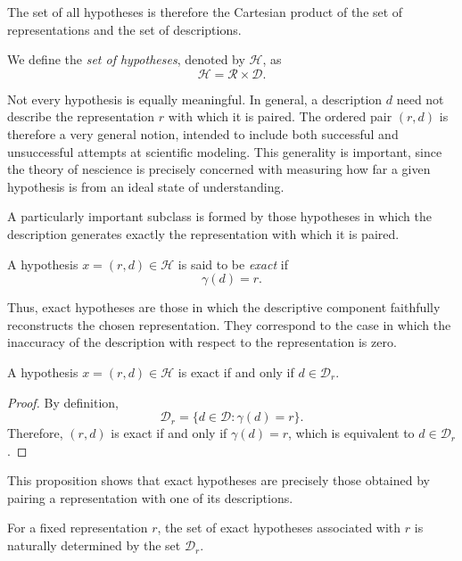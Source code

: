 The set of all hypotheses is therefore the Cartesian product of the set of representations and the set of descriptions.

\begin{definition}
\label{def:set_of_hypotheses}
We define the \emph{set of hypotheses}, denoted by \(\mathcal{H}\), as
\[
\mathcal{H} = \mathcal{R} \times \mathcal{D}.
\]
\end{definition}

Not every hypothesis is equally meaningful. In general, a description \(d\) need not describe the representation \(r\) with which it is paired. The ordered pair \((r,d)\) is therefore a very general notion, intended to include both successful and unsuccessful attempts at scientific modeling. This generality is important, since the theory of nescience is precisely concerned with measuring how far a given hypothesis is from an ideal state of understanding.

A particularly important subclass is formed by those hypotheses in which the description generates exactly the representation with which it is paired.

\begin{definition}
\label{def:exact_hypothesis}
A hypothesis \(x=(r,d)\in\mathcal{H}\) is said to be \emph{exact} if
\[
\gamma(d)=r.
\]
\end{definition}

Thus, exact hypotheses are those in which the descriptive component faithfully reconstructs the chosen representation. They correspond to the case in which the inaccuracy of the description with respect to the representation is zero.

\begin{proposition}
\label{prop:exact_hypothesis_equiv}
A hypothesis \(x=(r,d)\in\mathcal{H}\) is exact if and only if \(d \in \mathcal{D}_r\).
\end{proposition}

\begin{proof}
By definition,
\[
\mathcal{D}_r = \{ d \in \mathcal{D} : \gamma(d)=r \}.
\]
Therefore, \((r,d)\) is exact if and only if \(\gamma(d)=r\), which is equivalent to \(d \in \mathcal{D}_r\).
\end{proof}

This proposition shows that exact hypotheses are precisely those obtained by pairing a representation with one of its descriptions.

For a fixed representation \(r\), the set of exact hypotheses associated with \(r\) is naturally determined by the set \(\mathcal{D}_r\).

